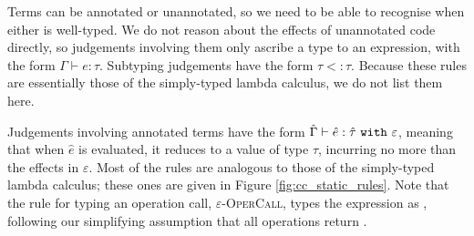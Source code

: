 Terms can be annotated or unannotated, so we need to be able to
recognise when either is well-typed. We do not reason about the
effects of unannotated code directly, so judgements involving them
only ascribe a type to an expression, with the form $\Gamma \vdash e: \tau$.
Subtyping judgements have the form $\tau <: \tau$. Because these rules are
essentially those of the simply-typed lambda calculus, we do not list
them here.

Judgements involving annotated terms have the form
$\hat \Gamma \vdash \hat e: \hat \tau~\mathtt{with}~ \varepsilon$, meaning that
when $\hat e$ is evaluated, it reduces to a value of type $\hat \tau$,
incurring no more than the effects in $\varepsilon$. 
Most of the rules are analogous to those of the simply-typed lambda calculus;
these ones are given in Figure \ref{fig:cc_static_rules}. Note that the rule for
typing an operation call, \textsc{$\varepsilon$-OperCall}, types the expression
as , following our simplifying assumption that all operations return
.

